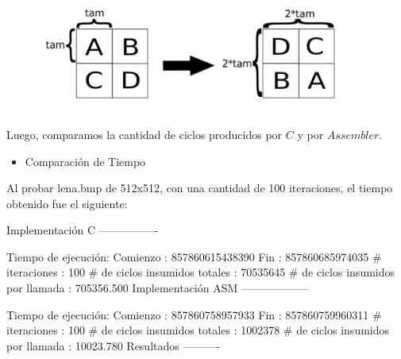 \documentclass[10pt, a4paper]{article}
\begin{document}
\begin{itemize}
\begin{figure}[H] %
\begin{center}
\includegraphics[width=300pt]{./recortar.jpg}
\end{center}
\end{figure}

Luego, comparamos la cantidad de ciclos producidos por $C$ y por $Assembler$.\newline
\begin{itemize}
\item{Comparación de Tiempo}
\end{itemize}
Al probar lena.bmp de 512x512, con una cantidad de 100 iteraciones, el tiempo obtenido fue el siguiente:\newline

Implementación C\newline
----------------\newline

Tiempo de ejecución:\newline
  Comienzo                          : 857860615438390\newline
  Fin                               : 857860685974035\newline
  \# iteraciones                     : 100\newline
  \# de ciclos insumidos totales     : 70535645\newline
  \# de ciclos insumidos por llamada : 705356.500\newline
\newline
Implementación ASM\newline
------------------\newline

Tiempo de ejecución:\newline
  Comienzo                          : 857860758957933\newline
  Fin                               : 857860759960311\newline
  \# iteraciones                     : 100\newline
  \# de ciclos insumidos totales     : 1002378\newline
  \# de ciclos insumidos por llamada : 10023.780\newline
\newline
Resultados\newline
----------\newline


\end{itemize}
\end{document}
